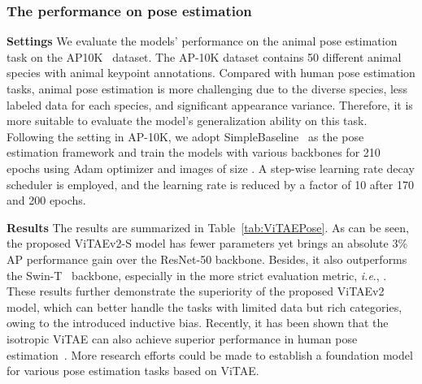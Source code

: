 \documentclass[twocolumn]{svjour3}          \smartqed  \usepackage{natbib}
\newcommand{\ie}{i.e}
\def\onedot{.\xspace}
\def\ie{\emph{i.e}\onedot}
\begin{document}
\subsubsection{The performance on pose estimation}

\begin{table}[htbp]
  \centering
{}\label{tab:ViTAEPose}\end{table}

\noindent \textbf{Settings} We evaluate the models' performance on the animal pose estimation task on the AP10K~\citep{yu2021ap} dataset. The AP-10K dataset contains 50 different animal species with animal keypoint annotations. Compared with human pose estimation tasks, animal pose estimation is more challenging due to the diverse species, less labeled data for each species, and significant appearance variance. Therefore, it is more suitable to evaluate the model's generalization ability on this task. Following the setting in AP-10K, we adopt SimpleBaseline~\citep{xiao2018simple} as the pose estimation framework and train the models with various backbones for 210 epochs using Adam optimizer and images of size . A step-wise learning rate decay scheduler is employed, and the learning rate is reduced by a factor of 10 after 170 and 200 epochs.

\noindent \textbf{Results} The results are summarized in Table~\ref{tab:ViTAEPose}. As can be seen, the proposed ViTAEv2-S model has fewer parameters yet brings an absolute 3\% AP performance gain over the ResNet-50 backbone. Besides, it also outperforms the Swin-T~\citep{liu2021swin} backbone, especially in the more strict evaluation metric, \ie, . These results further demonstrate the superiority of the proposed ViTAEv2 model, which can better handle the tasks with limited data but rich categories, owing to the introduced inductive bias. Recently, it has been shown that the isotropic ViTAE can also achieve superior performance in human pose estimation~\citep{xu2022vitpose}. More research efforts could be made to establish a foundation model for various pose estimation tasks based on ViTAE.
\end{document}
